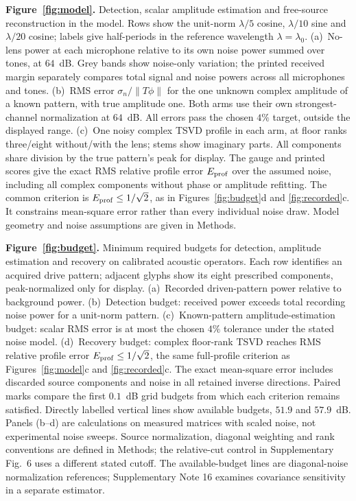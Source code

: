 \documentclass[lineno,pdflatex,sn-nature]{sn-jnl}%
\theoremstyle{thmstyleone}%
\theoremstyle{thmstyletwo}%
\theoremstyle{thmstylethree}%
\begin{document}
\noindent\textbf{Figure~\ref{fig:model}.} Detection, scalar amplitude estimation and free-source reconstruction in the model. Rows show the unit-norm $\lambda/5$ cosine, $\lambda/10$ sine and $\lambda/20$ cosine; labels give half-periods in the reference wavelength $\lambda=\lambda_0$. (a)~No-lens power at each microphone relative to its own noise power summed over tones, at $64$~dB. Grey bands show noise-only variation; the printed received margin separately compares total signal and noise powers across all microphones and tones. (b)~RMS error $\sigma_n/\|T\phi\|$ for the one unknown complex amplitude of a known pattern, with true amplitude one. Both arms use their own strongest-channel normalization at $64$~dB. All errors pass the chosen $4\%$ target, outside the displayed range. (c)~One noisy complex TSVD profile in each arm, at floor ranks three/eight without/with the lens; stems show imaginary parts. All components share division by the true pattern's peak for display. The gauge and printed scores give the exact RMS relative profile error $E_{\rm prof}$ over the assumed noise, including all complex components without phase or amplitude refitting. The common criterion is $E_{\rm prof}\le1/\sqrt2$, as in Figures~\ref{fig:budget}d and \ref{fig:recorded}c. It constrains mean-square error rather than every individual noise draw. Model geometry and noise assumptions are given in Methods.
\par

\noindent\textbf{Figure~\ref{fig:budget}.} Minimum required budgets for detection, amplitude estimation and recovery on calibrated acoustic operators. Each row identifies an acquired drive pattern; adjacent glyphs show its eight prescribed components, peak-normalized only for display. (a)~Recorded driven-pattern power relative to background power. (b)~Detection budget: received power exceeds total recording noise power for a unit-norm pattern. (c)~Known-pattern amplitude-estimation budget: scalar RMS error is at most the chosen $4\%$ tolerance under the stated noise model. (d)~Recovery budget: complex floor-rank TSVD reaches RMS relative profile error $E_{\rm prof}\le1/\sqrt2$, the same full-profile criterion as Figures~\ref{fig:model}c and \ref{fig:recorded}c. The exact mean-square error includes discarded source components and noise in all retained inverse directions. Paired marks compare the first $0.1$~dB grid budgets from which each criterion remains satisfied. Directly labelled vertical lines show available budgets, $51.9$ and $57.9$~dB. Panels (b--d) are calculations on measured matrices with scaled noise, not experimental noise sweeps. Source normalization, diagonal weighting and rank conventions are defined in Methods; the relative-cut control in Supplementary Fig.~6 uses a different stated cutoff. The available-budget lines are diagonal-noise normalization references; Supplementary Note 16 examines covariance sensitivity in a separate estimator.
\par
\end{document}

